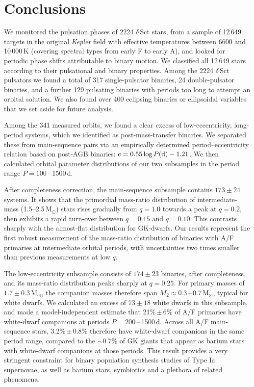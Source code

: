 \documentclass[a4paper,fleqn,usenatbib]{mnras}
\begin{document}



\section{Conclusions}
\label{sec:conclusions}

We monitored the pulsation phases of 2224 $\delta$\,Sct stars, from a sample of 12\,649 targets in the original \textit{Kepler} field with effective temperatures between 6600 and 10\,000\,K (covering spectral types from early F to early A), and looked for periodic phase shifts attributable to binary motion.
We classified all 12\,649 stars according to their pulsational and binary properties. Among the 2224 $\delta$\,Sct pulsators we found a total of 317 single-pulsator binaries, 24 double-pulsator binaries, and a further 129 pulsating binaries with periods too long to attempt an orbital solution. We also found over 400 eclipsing binaries or ellipsoidal variables that we set aside for future analysis.

Among the 341 measured orbits, we found a clear excess of low-eccentricity, long-period systems, which we identified as post-mass-transfer binaries. We separated these from main-sequence pairs via an empirically determined period--eccentricity relation based on post-AGB binaries: $e = 0.55 \log P ({\rm d}) - 1.21$. We then calculated orbital parameter distributions of our two subsamples in the period range $P = 100$\,--\,1500\,d.

After completeness correction, the main-sequence subsample contains $173\pm24$ systems. It shows that the primordial mass-ratio distribution of intermediate-mass (1.5--2.5\,M$_{\odot}$) stars rises gradually from $q=1.0$ towards a peak at $q=0.2$, then exhibits a rapid turn-over between $q=0.15$ and $q=0.10$. This contrasts sharply with the almost-flat distribution for GK-dwarfs. Our results represent the first robust measurement of the mass-ratio distribution of binaries with A/F primaries at intermediate orbital periods, with uncertainties two times smaller than previous measurements at low $q$.

The low-eccentricity subsample consists of $174\pm23$ binaries, after completeness, and its mass-ratio distribution peaks sharply at $q=0.25$. For primary masses of $1.7\pm0.3$\,M$_{\odot}$, the companion masses therefore span $M_2 \approx 0.3$\,--\,0.7\,M$_{\odot}$, typical for white dwarfs. We calculated an excess of $73\pm18$ white dwarfs in this subsample, and made a model-independent estimate that 21\%\,$\pm$\,6\% of A/F primaries have white-dwarf companions at periods $P=200$\,--\,1500\,d. Across all A/F main-sequence stars, 3.2\%\,$\pm$\,0.8\% therefore have white-dwarf companions in the same period range, compared to the $\sim$0.7\% of GK giants that appear as barium stars with white-dwarf companions at those periods. This result provides a very stringent constraint for binary population synthesis studies of Type Ia supernovae, as well as barium stars, symbiotics and a plethora of related phenomena.
\end{document}
